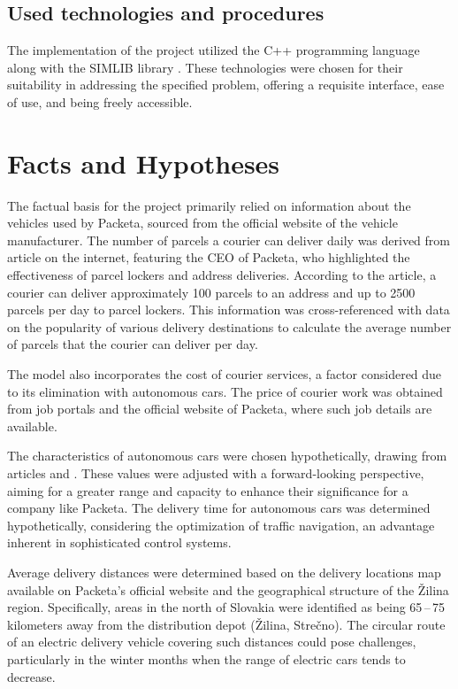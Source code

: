 \documentclass[a4paper, 11pt, a4paper]{article}
\begin{document}
\subsection{Used technologies and procedures}

The implementation of the project utilized the C++ programming language along with the SIMLIB library \cite{SIMLIB}.
These technologies were chosen for their suitability in addressing the specified problem, offering a requisite interface,
ease of use, and being freely accessible.


\section{Facts and Hypotheses}

The factual basis for the project primarily relied on information about the vehicles used by Packeta, sourced from the official
website of the vehicle manufacturer. The number of parcels a courier can deliver daily was derived from article \cite{parcels.num} on the internet,
featuring the CEO of Packeta, who highlighted the effectiveness of parcel lockers and address deliveries. According to the article,
a courier can deliver approximately 100 parcels to an address and up to 2500 parcels per day to parcel lockers. This information was
cross-referenced with data on the popularity of various delivery destinations \cite{delivery.percentage} to calculate the average number of
parcels that the courier can deliver per day.

The model also incorporates the cost of courier services, a factor considered due to its elimination with autonomous cars.
The price of courier work was obtained from job portals and the official website of Packeta, where such job details are available.

The characteristics of autonomous cars were chosen hypothetically, drawing from articles \cite{autonomous.emissions} and \cite{autonomous.models}. These values were adjusted with a
forward-looking perspective, aiming for a greater range and capacity to enhance their significance for a company like Packeta. The delivery
time for autonomous cars was determined hypothetically, considering the optimization of traffic navigation, an advantage inherent in sophisticated
control systems.

Average delivery distances were determined based on the delivery locations map available on Packeta's official website \cite{packeta} and the geographical
structure of the Žilina region. Specifically, areas in the north of Slovakia were identified as being 65\,--\,75 kilometers away from the
distribution depot (Žilina, Strečno). The circular route of an electric delivery vehicle covering such distances could pose challenges,
particularly in the winter months when the range of electric cars tends to decrease.
\end{document}
